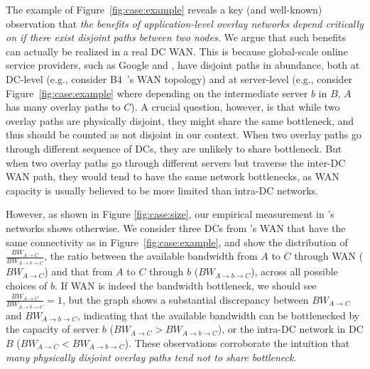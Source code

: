  The example of Figure~\ref{fig:case:example} reveals a key (and well-known) observation that
{\em the benefits of application-level overlay networks depend critically on if there exist disjoint paths between two nodes.}
We argue that such benefits can actually be realized in a
real DC WAN. This is because
global-scale online service providers,
such as Google and \company, have disjoint paths in abundance,
both at DC-level (e.g., consider B4~\cite{jain2013b4}'s WAN topology)
and at server-level (e.g., consider Figure~\ref{fig:case:example}
where depending on the intermediate server $b$ in $B$,
$A$ has many overlay paths to $C$).
A crucial question, however, is that while two overlay paths are
physically disjoint, they might share the same bottleneck, and
thus should be counted as not disjoint in our context.
When two overlay paths go through different sequence of DCs,
they are unlikely to share bottleneck.
But when two overlay paths go through different servers but traverse
the inter-DC WAN path, they would tend to have the same network
bottlenecks, as WAN capacity is usually believed to be more
limited than intra-DC networks.

However, as shown in Figure \ref{fig:case:size},
our empirical measurement in \company's networks shows
otherwise.
We consider three DCs from \company's WAN that have the same
connectivity as in Figure~\ref{fig:case:example},
and show the distribution of
$\frac{BW_{A\rightarrow C}}{BW_{A\rightarrow b\rightarrow C}}$,
the ratio between the available bandwidth
from $A$ to $C$ through WAN ($BW_{A\rightarrow C}$) and
that from $A$ to $C$ through $b$
($BW_{A\rightarrow b\rightarrow C}$),
across all possible choices of $b$.
If WAN is indeed the bandwidth bottleneck, we should see
$\frac{BW_{A\rightarrow C}}{BW_{A\rightarrow b\rightarrow C}}=1$,
but the graph shows a substantial discrepancy between
$BW_{A\rightarrow C}$ and $BW_{A\rightarrow b\rightarrow C}$,
indicating that the available bandwidth can be bottlenecked by
the capacity of server $b$
($BW_{A\rightarrow C}>BW_{A\rightarrow b\rightarrow C}$),
or the intra-DC network in DC $B$
($BW_{A\rightarrow C}<BW_{A\rightarrow b\rightarrow C}$).
These observations corroborate the intuition that
{\em many physically
disjoint overlay paths tend not to share bottleneck}.


